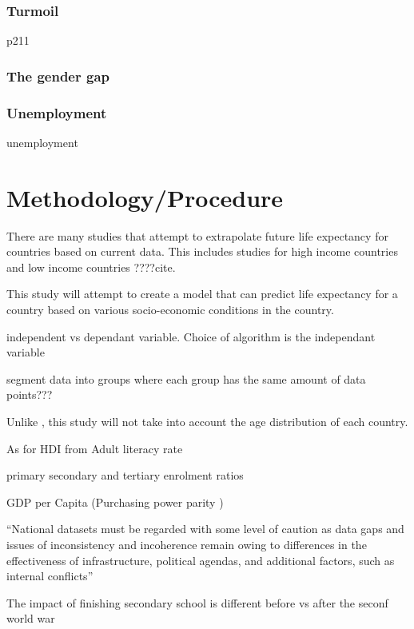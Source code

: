 \documentclass[10pt,a4paper]{article}
\begin{document}
\cite{CDC1999}

\subsubsection{Turmoil}
\citep{Low2008} p211

\subsubsection{The gender gap}

\cite{Rochelle2015}

\subsubsection{Unemployment}
unemployment \cite{Bonamore2015} \cite{Roelfs2011} \cite{Roelfs2015} 

\section{Methodology/Procedure}

There are many studies that attempt to extrapolate future life expectancy for countries based on current data. This includes studies for high income countries \citep{Kontis2017} and low income countries ????{cite}.

This study will attempt to create a model that can predict life expectancy for a country based on various socio-economic conditions in the country.


independent vs dependant variable. Choice of algorithm is the independant variable


segment data into groups where each group has the same amount of data points???

Unlike \cite{Shaw2005}, this study will not take into account the age distribution of each country.

As for HDI from \cite{Bulled2010}
Adult literacy rate

primary secondary and tertiary enrolment ratios

GDP per Capita (Purchasing power parity )


``National datasets must be regarded with some level of caution as data gaps and issues of inconsistency and incoherence remain owing to differences in the effectiveness of infrastructure, political agendas, and additional factors, such as internal conflicts'' \cite{Bulled2010}  


The impact of finishing secondary school is different before vs after the seconf world war \cite{Deboosere2009}
\end{document}
